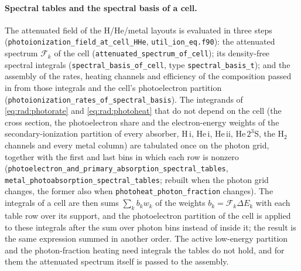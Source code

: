 \paragraph{Spectral tables and the spectral basis of a cell.}  The
attenuated field of the H/He/metal layouts is evaluated in three steps
(\texttt{photoionization\_field\_at\_cell\_HHe}, \texttt{util\_ion\_eq.f90}):
the attenuated spectrum $\mathcal{F}_k$ of the cell
(\texttt{attenuated\_spectrum\_of\_cell}); its density-free spectral
integrals (\texttt{spectral\_basis\_of\_cell}, type
\texttt{spectral\_basis\_t}); and the assembly of the rates, heating channels
and efficiency of the composition passed in from those integrals and the
cell's photoelectron partition
(\texttt{photoionization\_rates\_of\_spectral\_basis}).  The integrands of
\eqref{eq:rad:photorate} and \eqref{eq:rad:photoheat} that do not depend on
the cell (the cross section, the photoelectron share and the electron-energy
weights of the secondary-ionization partition of every absorber, H\,{\sc i},
He\,{\sc i}, He\,{\sc ii}, He\,$2^3$S, the H$_2$ channels and every metal
column) are tabulated once on the photon grid, together with the first and
last bins in which each row is nonzero
(\texttt{photoelectron\_and\_primary\_absorption\_spectral\_tables},
\texttt{metal\_photoabsorption\_spectral\_tables}; rebuilt when the photon
grid changes, the former also when \texttt{photoheat\_photon\_fraction}
changes).  The integrals of a cell are
then sums $\sum_k b_k w_{k}$ of the weights $b_k = \mathcal{F}_k\Delta E_k$
with each table row over its support, and the photoelectron partition of the
cell is applied to these integrals after the sum over photon bins instead of
inside it; the result is the same expression summed in another order.  The
active low-energy partition and the photon-fraction heating need integrals
the tables do not hold, and for them the attenuated spectrum itself is
passed to the assembly.

